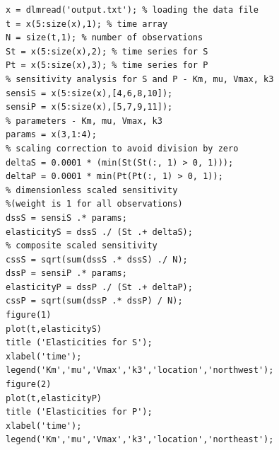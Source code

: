 \begin{verbatim}
x = dlmread('output.txt'); % loading the data file
t = x(5:size(x),1); % time array
N = size(t,1); % number of observations
St = x(5:size(x),2); % time series for S
Pt = x(5:size(x),3); % time series for P
% sensitivity analysis for S and P - Km, mu, Vmax, k3 
sensiS = x(5:size(x),[4,6,8,10]); 
sensiP = x(5:size(x),[5,7,9,11]);
% parameters - Km, mu, Vmax, k3
params = x(3,1:4); 
% scaling correction to avoid division by zero
deltaS = 0.0001 * (min(St(St(:, 1) > 0, 1))); 
deltaP = 0.0001 * min(Pt(Pt(:, 1) > 0, 1));
% dimensionless scaled sensitivity 
%(weight is 1 for all observations)
dssS = sensiS .* params; 
elasticityS = dssS ./ (St .+ deltaS); 
% composite scaled sensitivity
cssS = sqrt(sum(dssS .* dssS) ./ N); 
dssP = sensiP .* params;
elasticityP = dssP ./ (St .+ deltaP); 
cssP = sqrt(sum(dssP .* dssP) / N); 
figure(1)
plot(t,elasticityS)
title ('Elasticities for S');
xlabel('time');
legend('Km','mu','Vmax','k3','location','northwest');
figure(2)
plot(t,elasticityP)
title ('Elasticities for P');
xlabel('time');
legend('Km','mu','Vmax','k3','location','northeast');

\end{verbatim}


